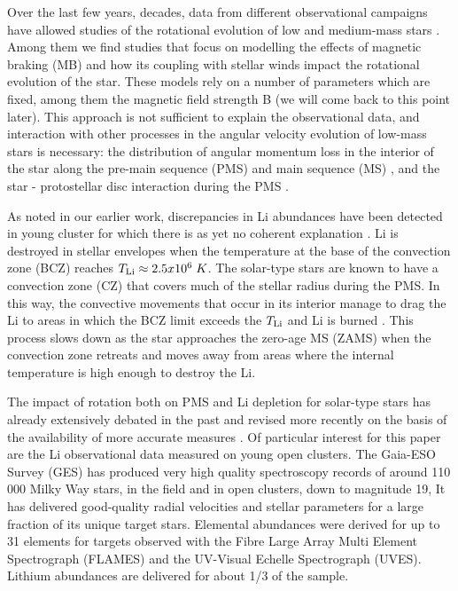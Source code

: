 \documentclass[fleqn,usenatbib]{mnras}
\begin{document}
Over the last few years, decades, data from different observational campaigns have allowed studies of the rotational evolution of low and medium-mass stars \citep{Hartman2010,Gallet2013,Bouvier2016}. 
Among them we find studies \citep{Ud-Doula2008,Cranmer2011,Gallet2015,Amard2016} that focus on modelling the effects of magnetic braking (MB) and how its coupling with stellar winds impact the rotational evolution of the star. These models rely on a number of parameters which are fixed, among them the magnetic field strength B (we will come back to this point later). This approach is not sufficient to explain the observational data, and interaction with other processes in the angular velocity evolution of low-mass stars is necessary: the distribution of angular momentum loss in the interior of the star along the pre-main sequence (PMS) and main sequence (MS) \citep{Charbonnel2005, Eggenberger2008, Eggenberger2009, Navarro2020}, and the star - protostellar disc interaction during the PMS \citep{Bouvier2008,Gallet2013,Eggenberger2012,Zanni2012,Bouvier2016}.\par

As noted in our earlier work, discrepancies in Li abundances have been detected in young cluster for which there is as yet no coherent explanation \citep[see][and references therein]{Navarro2020}. Li is destroyed in stellar envelopes when the temperature at the base of the convection zone (BCZ) reaches $T_{\mathrm{Li}} \approx 2.5 x 10^6\; K$. The solar-type stars are known to have a convection zone (CZ) that covers much of the stellar radius during the PMS. In this way, the convective movements that occur in its interior manage to drag the Li to areas in which the BCZ limit exceeds the $T_{\mathrm{Li}}$ and Li is burned \citep{Iben1965}. This process slows down as the star approaches the zero-age MS (ZAMS) when the convection zone retreats and moves away from areas where the internal temperature is high enough to destroy the Li.\par

The impact of rotation both on PMS and Li depletion for solar-type stars has already extensively debated in the past \citep{Pinsonneault1997,Jeffries2004,Somers2014} and revised more recently on the basis of the availability of more accurate measures \citep{Gallet2013,Bouvier2016, Bouvier2018, Franciosini2022}. Of particular interest for this paper are the Li observational data measured on young open clusters. The Gaia-ESO Survey (GES) \citep{Gilmore2012,Randich2013,Randich2022} has produced very high quality spectroscopy records of around 110 000 Milky Way stars, in the field and in open clusters, down to magnitude 19, It has delivered good-quality radial velocities and stellar parameters for a large fraction of its unique target stars. Elemental abundances were derived for up to 31 elements for targets observed with the Fibre Large Array Multi Element Spectrograph (FLAMES) and the UV-Visual Echelle Spectrograph (UVES). Lithium abundances are delivered for about 1/3 of the sample.\par
\end{document}
